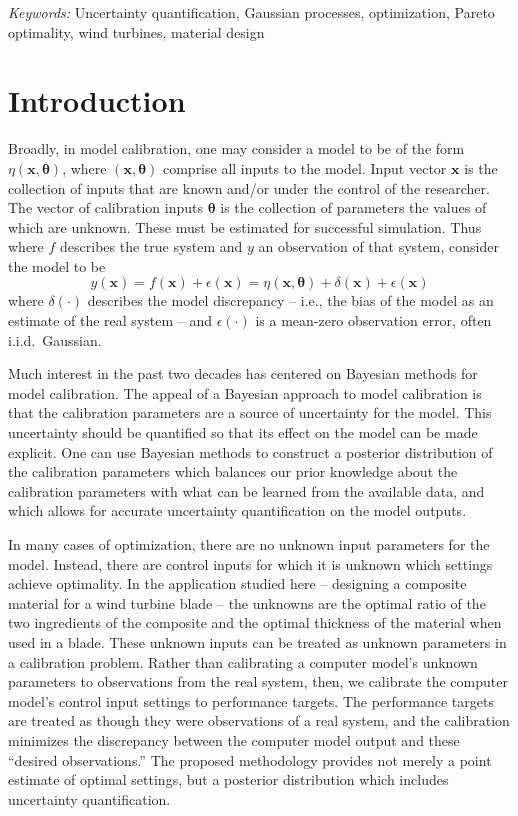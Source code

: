 \documentclass[12pt]{article}
\begin{document}
\noindent%
{\it Keywords:}  Uncertainty quantification, Gaussian processes, optimization, Pareto optimality, wind turbines, material design
\vfill

\newpage
{} %
\section{Introduction}
\label{introduction}

Broadly, in model calibration, one may consider a model to be of the form $\eta(\mathbf x,\boldsymbol \theta)$, where $(\mathbf x,\boldsymbol \theta)$ comprise all inputs to the model. 
%
Input vector $\mathbf x$ is the collection of inputs that are known and/or under the control of the researcher.
%
The vector of calibration inputs $\boldsymbol \theta$ is the collection of parameters the values of which are unknown. 
%
These must be estimated for successful simulation. 
%
Thus where $f$ describes the true system and $y$ an observation of that system, consider the model to be 
%
\begin{equation} \label{eq:model_gen}
y(\mathbf x)=f(\mathbf x)+\epsilon(\mathbf x)=\eta(\mathbf x,\boldsymbol \theta) + \delta(\mathbf x)+\epsilon(\mathbf x)
\end{equation} 
%
where $\delta(\cdot)$ describes the model discrepancy -- i.e., the bias of the model as an estimate of the real system -- and $\epsilon(\cdot)$ is a mean-zero observation error, often i.i.d.\ Gaussian. 
%

Much interest in the past two decades has centered on Bayesian methods for model calibration. 
%
The appeal of a Bayesian approach to model calibration is that the calibration parameters are a source of uncertainty for the model. 
%
This uncertainty should be quantified so that its effect on the model can be made explicit. 
%
One can use Bayesian methods to construct a posterior distribution of the calibration parameters which balances our prior knowledge about the calibration parameters with what can be learned from the available data, and which allows for accurate uncertainty quantification on the model outputs. 

In many cases of optimization, there are no unknown input parameters for the model. 
%
Instead, there are control inputs for which it is unknown which settings achieve optimality.
%
In the application studied here -- designing a composite material for a wind turbine blade -- the unknowns are the optimal ratio of the two ingredients of the composite and the optimal thickness of the material when used in a blade.
%
These unknown inputs can be treated as unknown parameters in a calibration problem.
%
Rather than calibrating a computer model's unknown parameters to observations from the real system, then, we calibrate the computer model's control input settings to performance targets.
%
The performance targets are treated as though they were observations of a real system, and the calibration minimizes the discrepancy between the computer model output and these ``desired observations.''
%
The proposed methodology provides not merely a point estimate of optimal settings, but a posterior distribution which includes uncertainty quantification.
\end{document}
